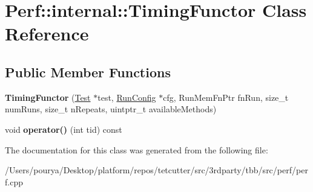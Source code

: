 \hypertarget{classPerf_1_1internal_1_1TimingFunctor}{}\section{Perf\+:\+:internal\+:\+:Timing\+Functor Class Reference}
\label{classPerf_1_1internal_1_1TimingFunctor}
\subsection*{Public Member Functions}
\begin{DoxyCompactItemize}
\item 
\hypertarget{classPerf_1_1internal_1_1TimingFunctor_a9659c612dc2cca132d5ea45852e099fc}{}{\bfseries Timing\+Functor} (\hyperlink{classPerf_1_1Test}{Test} $\ast$test, \hyperlink{structPerf_1_1internal_1_1RunConfig}{Run\+Config} $\ast$cfg, Run\+Mem\+Fn\+Ptr fn\+Run, size\+\_\+t num\+Runs, size\+\_\+t n\+Repeats, uintptr\+\_\+t available\+Methods)\label{classPerf_1_1internal_1_1TimingFunctor_a9659c612dc2cca132d5ea45852e099fc}

\item 
\hypertarget{classPerf_1_1internal_1_1TimingFunctor_a3e908c92b73e1e0decb7afc27cae0ecc}{}void {\bfseries operator()} (int tid) const \label{classPerf_1_1internal_1_1TimingFunctor_a3e908c92b73e1e0decb7afc27cae0ecc}

\end{DoxyCompactItemize}


The documentation for this class was generated from the following file\+:\begin{DoxyCompactItemize}
\item 
/\+Users/pourya/\+Desktop/platform/repos/tetcutter/src/3rdparty/tbb/src/perf/perf.\+cpp\end{DoxyCompactItemize}
